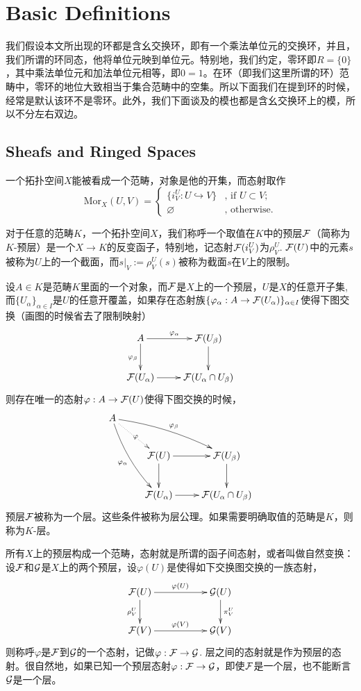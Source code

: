 \renewcommand\chapterimg{Pictures/7.png}
\chapter{Basic Definitions}

我们假设本文所出现的环都是含幺交换环，即有一个乘法单位元的交换环，并且，我们所谓的环同态，他将单位元映到单位元。特别地，我们约定，零环即$R=\{0\}$，其中乘法单位元和加法单位元相等，即$0=1$。在环（即我们这里所谓的环）范畴中，零环的地位大致相当于集合范畴中的空集。所以下面我们在提到环的时候，经常是默认该环不是零环。此外，我们下面谈及的模也都是含幺交换环上的模，所以不分左右双边。

\section{Sheafs and Ringed Spaces}

\para 一个拓扑空间$X$能被看成一个范畴，对象是他的开集，而态射取作
\[
	\mathrm{Mor}_{X}(U,V)=\begin{cases}
	\bigl\{i^U_V:U\hookrightarrow V\bigr\}&\text{, if }U\subset V\text{;}\\
	\varnothing&\text{, otherwise}.
	\end{cases}
\]

\para 对于任意的范畴$K$，一个拓扑空间$X$，我们称呼一个取值在$K$中的预层$\mathcal{F}$（简称为$K$-预层）是一个$X\to K$的反变函子，特别地，记态射$\mathcal{F}(i^U_V)$为$\rho^U_V$. $\mathcal{F}(U)$中的元素$s$被称为$U$上的一个截面，而$s|_V:=\rho^U_V(s)$被称为截面$s$在$V$上的限制。

\para 设$A\in K$是范畴$K$里面的一个对象，而$\mathcal{F}$是$X$上的一个预层，$U$是$X$的任意开子集, 而$\{U_\alpha\}_{\alpha\in I}$是$U$的任意开覆盖，如果存在态射族$\{\varphi_\alpha:A\to \mathcal{F}(U_\alpha)\}_{\alpha\in I}$使得下图交换（画图的时候省去了限制映射）
\[
	\xymatrix{
		A\ar[r]^{\varphi_{\alpha}}\ar[d]_{\varphi_{\beta}}&\calf(U_\beta)\ar[d]\\
		\calf(U_\alpha)\ar[r]&\calf(U_{\alpha}\cap U_{\beta})
	}
\]
则存在唯一的态射$\varphi:A\to \mathcal{F}(U)$使得下图交换的时候，
\[
	\xymatrix{
		A\ar@/_/[ddr]_{\varphi_{\alpha}}\ar@/^/[drr]^{\varphi_{\beta}}\ar@{.>}[dr]|{\varphi}&& \\
		&\calf(U)\ar[r]\ar[d]&\calf(U_\beta)\ar[d]\\
		&\calf(U_\alpha)\ar[r]&\calf(U_{\alpha}\cap U_{\beta})
	}
\]
预层$\mathcal{F}$被称为一个层。这些条件被称为层公理。如果需要明确取值的范畴是$K$，则称为$K$-层。

\para 所有$X$上的预层构成一个范畴，态射就是所谓的函子间态射，或者叫做自然变换：设$\mathcal{F}$和$\mathcal{G}$是$X$上的两个预层，设$\varphi(U)$是使得如下交换图交换的一族态射，
\[
	\xymatrix{
		\calf(U)\ar[rr]^{\varphi(U)} \ar[d]_{\rho^U_V}&&\calg(U) \ar[d]^{\pi^U_V}\\
		\calf(V)\ar[rr]^{\varphi(V)}&&\calg(V)
	}
\]
则称呼$\varphi$是$\mathcal{F}$到$\mathcal{G}$的一个态射，记做$\varphi:\mathcal{F}\to\mathcal{G}$. 层之间的态射就是作为预层的态射。很自然地，如果已知一个预层态射$\varphi:\mathcal{F}\to\mathcal{G}$，即使$\mathcal{F}$是一个层，也不能断言$\mathcal{G}$是一个层。

